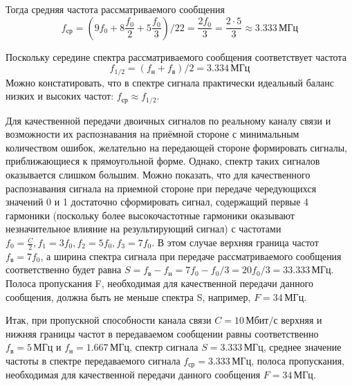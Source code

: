Тогда средняя частота рассматриваемого сообщения
\[
	f_{\text{ср}} = \left(9f_0+8\frac{f_0}{2}+5\frac{f_0}{3}\right)/ 22 = \frac{2f_0}{3} = \frac{2 \cdot 5}{3} \approx 3.333 \, \text{МГц}
\]

Поскольку середине спектра рассматриваемого сообщения соответствует частота
\[
	f_{1/2} = (f_{\text{н}} + f_{\text{в}}) /2 = 3.334 \, \text{МГц}
\]
Можно констатировать, что в спектре сигнала практически идеальный баланс низких и высоких частот: $f_{\text{ср}} \approx f_{1/2}$.

Для качественной передачи двоичных сигналов по реальному каналу связи и возможности их распознавания на приёмной стороне с минимальным количеством ошибок, желательно на передающей стороне формировать сигналы, приближающиеся к прямоугольной форме. Однако, спектр таких сигналов оказывается слишком большим. Можно показать, что для качественного распознавания сигнала на приемной стороне при передаче чередующихся значений 0 и 1 достаточно сформировать сигнал, содержащий первые 4 гармоники (поскольку более высокочастотные гармоники оказывают незначительное влияние на результирующий сигнал) с частотами $f_0=\frac{C}{2}, f_1=3f_0, f_2=5f_0, f_3=7f_0$. В этом случае верхняя граница частот $f_{\text{в}}=7f_0$, а ширина спектра сигнала при передаче рассматриваемого сообщения соответственно будет равна $S = f_{\text{в}} - f_{\text{н}} = 7f_0-f_0/3=20f_0/3=33.333 \, \text{МГц}$. Полоса пропускания F, необходимая для качественной передачи данного сообщения, должна быть не меньше спектра S, например, $F = 34 \, \text{МГц}$.

Итак, при пропускной способности канала связи $C = 10 \, \text{Мбит/с}$ верхняя и нижняя границы частот в передаваемом сообщении равны соответственно $f_{\text{в}} = 5 \, \text{МГц}$ и $f_{\text{н}} = 1.667 \, \text{МГц}$, спектр сигнала $S = 3.333 \, \text{МГц}$, среднее значение частоты в спектре передаваемого сигнала $f_{\text{ср}} = 3.333 \, \text{МГц}$, полоса пропускания, необходимая для качественной передачи данного сообщения $F=34 \, \text{МГц}$.
